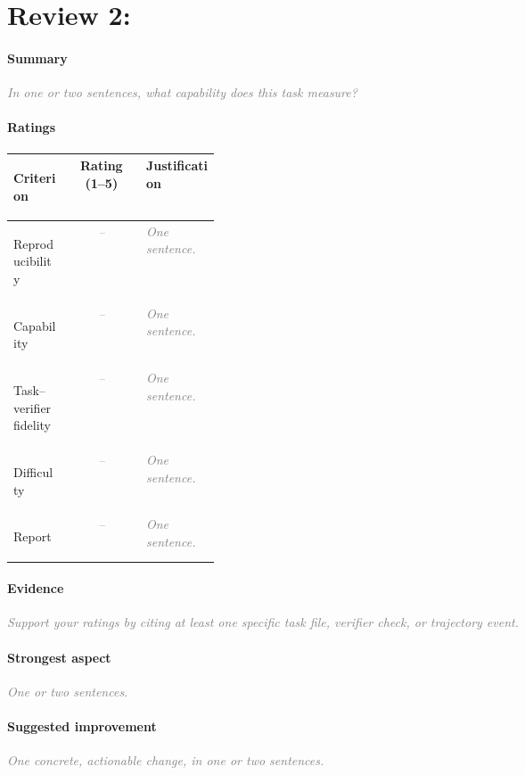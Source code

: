\documentclass[11pt]{article}
\newcommand{\prompt}[1]{\textcolor{gray}{\textit{#1}}}
\begin{document}
\newpage
\section*{Review 2: }

\paragraph{Summary}
\prompt{In one or two sentences, what capability does this task measure?}

\paragraph{Ratings}
\begin{center}
\renewcommand{\arraystretch}{1.3}
\begin{tabularx}{\linewidth}{>{\bfseries\raggedright\arraybackslash}p{0.27\linewidth}cX}
  \toprule
  Criterion & Rating (1--5) & Justification \\
  \midrule
  Reproducibility & \prompt{--} & \prompt{One sentence.} \\
  Capability & \prompt{--} & \prompt{One sentence.} \\
  Task--verifier fidelity & \prompt{--} & \prompt{One sentence.} \\
  Difficulty & \prompt{--} & \prompt{One sentence.} \\
  Report & \prompt{--} & \prompt{One sentence.} \\
  \bottomrule
\end{tabularx}
\end{center}

\paragraph{Evidence}
\prompt{Support your ratings by citing at least one specific task file, verifier check, or trajectory event.}

\paragraph{Strongest aspect}
\prompt{One or two sentences.}

\paragraph{Suggested improvement}
\prompt{One concrete, actionable change, in one or two sentences.}
\end{document}
